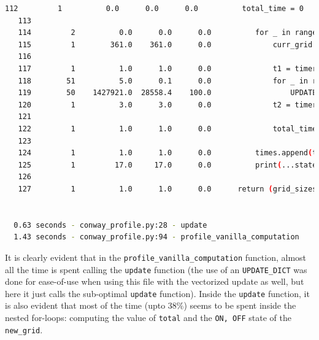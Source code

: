 \documentclass[a4paper,12pt]{article}
\begin{document}
\begin{lstlisting}[language=bash,basicstyle=\tiny\ttfamily]
   112         1          0.0      0.0      0.0          total_time = 0                                                                          
   113                                                                                                                                           
   114         2          0.0      0.0      0.0          for _ in range(num_runs):                                                               
   115         1        361.0    361.0      0.0              curr_grid = random_grid(curr_size)                                                  
   116                                                                                                                                           
   117         1          1.0      1.0      0.0              t1 = timer()                                                                        
   118        51          5.0      0.1      0.0              for _ in range(max_iters):                                                          
   119        50    1427921.0  28558.4    100.0                  UPDATE_DICT[update_method_key](curr_grid, curr_size)                            
   120         1          3.0      3.0      0.0              t2 = timer()                                                                        
   121                                                                                                                                           
   122         1          1.0      1.0      0.0              total_time += (t2 - t1)                                                             
   123                                                                                                                                           
   124         1          1.0      1.0      0.0          times.append(total_time / num_runs)                                                     
   125         1         17.0     17.0      0.0          print(...statement omitted for space...)                 
   126                                                                                                                                           
   127         1          1.0      1.0      0.0      return (grid_sizes, times)                                                                  


  0.63 seconds - conway_profile.py:28 - update
  1.43 seconds - conway_profile.py:94 - profile_vanilla_computation
\end{lstlisting}
It is clearly evident that in the \verb|profile_vanilla_computation| function, almost all the time is spent calling the \verb|update| function (the use of an \verb|UPDATE_DICT| was done for ease-of-use when using this file with the vectorized update as well, but here it just calls the sub-optimal \verb|update| function). Inside the \verb|update| function, it is also evident that most of the time (upto $38\%$) seems to be spent inside the nested for-loops: computing the value of \verb|total| and the \verb|ON, OFF| state of the \verb|new_grid|. 
\end{document}
